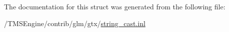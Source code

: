 The documentation for this struct was generated from the following file\+:\begin{DoxyCompactItemize}
\item 
/\+T\+M\+S\+Engine/contrib/glm/gtx/\hyperlink{string__cast_8inl}{string\+\_\+cast.\+inl}\end{DoxyCompactItemize}
